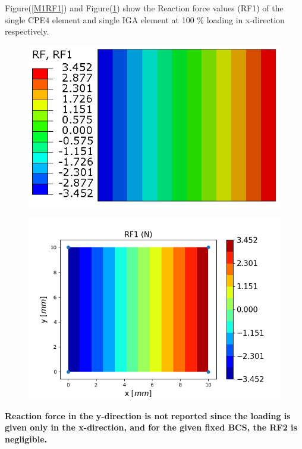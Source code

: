 \documentclass[12pt]{article}
\begin{document}
Figure(\ref{M1RF1}) and Figure(\ref{M1RF1_IGA}) show the Reaction force values (RF1) of the single CPE4 element and single IGA element at 100 \% loading in x-direction respectively. \\
\begin{figure}[H]
	\centering
	\begin{minipage}{.5\textwidth}
		\centering
		\includegraphics[width=1\linewidth]{M1RF1.png}
		\label{M1RF1}
	\end{minipage}%
	\begin{minipage}{.65\textwidth}
		\centering
		\includegraphics[width=1\linewidth]{M1RF1_IGA.png}
		\label{M1RF1_IGA}
	\end{minipage}
\end{figure}

\textbf{Reaction force in the y-direction is not reported since the loading is given only in the x-direction, and for the given fixed BCS, the RF2 is negligible.}  \\
\end{document}
